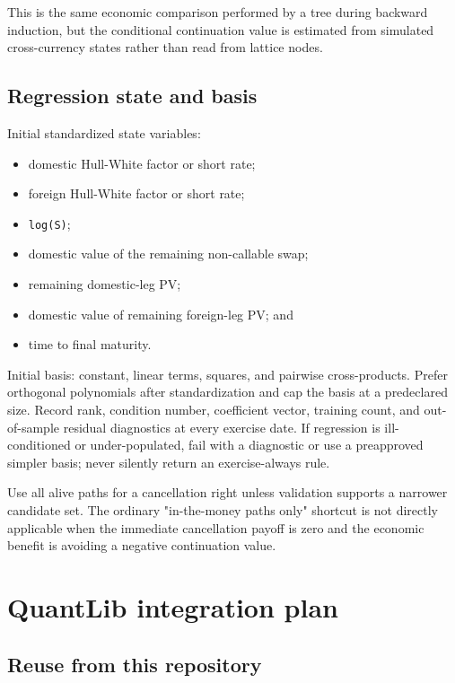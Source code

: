 \documentclass[conference]{IEEEtran}
\newcommand{\passthrough}[1]{#1}
\providecommand{\tightlist}{}
\begin{document}
This is the same economic comparison performed by a tree during backward
induction, but the conditional continuation value is estimated from
simulated cross-currency states rather than read from lattice nodes.

\subsection{Regression state and
basis}\label{83-regression-state-and-basis}

Initial standardized state variables:

\begin{itemize}
\tightlist
\item
  domestic Hull-White factor or short rate;
\item
  foreign Hull-White factor or short rate;
\item
  \passthrough{\lstinline!log(S)!};
\item
  domestic value of the remaining non-callable swap;
\item
  remaining domestic-leg PV;
\item
  domestic value of remaining foreign-leg PV; and
\item
  time to final maturity.
\end{itemize}

Initial basis: constant, linear terms, squares, and pairwise
cross-products. Prefer orthogonal polynomials after standardization and
cap the basis at a predeclared size. Record rank, condition number,
coefficient vector, training count, and out-of-sample residual
diagnostics at every exercise date. If regression is ill-conditioned or
under-populated, fail with a diagnostic or use a preapproved simpler
basis; never silently return an exercise-always rule.

Use all alive paths for a cancellation right unless validation supports
a narrower candidate set. The ordinary "in-the-money paths only"
shortcut is not directly applicable when the immediate cancellation
payoff is zero and the economic benefit is avoiding a negative
continuation value.

\section{QuantLib integration
plan}\label{9-quantlib-integration-plan}

\subsection{Reuse from this
repository}\label{91-reuse-from-this-repository}
\end{document}
